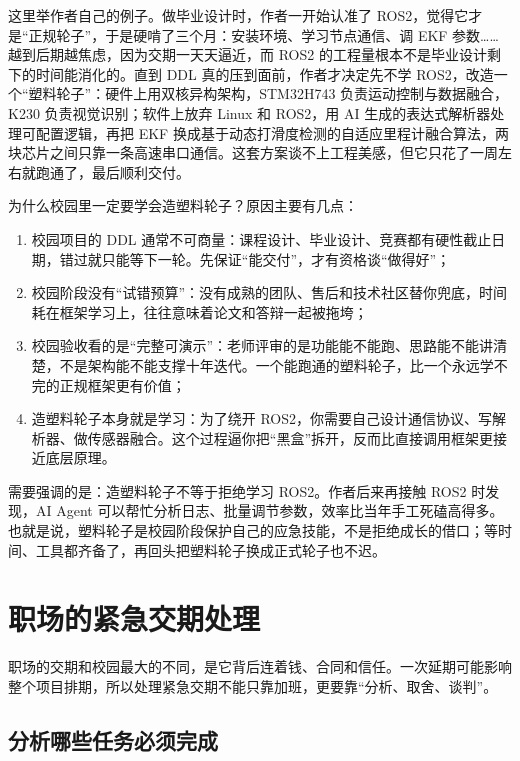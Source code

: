 这里举作者自己的例子。做毕业设计时，作者一开始认准了 ROS2，觉得它才是“正规轮子”，于是硬啃了三个月：安装环境、学习节点通信、调 EKF 参数……越到后期越焦虑，因为交期一天天逼近，而 ROS2 的工程量根本不是毕业设计剩下的时间能消化的。直到 DDL 真的压到面前，作者才决定先不学 ROS2，改造一个“塑料轮子”：硬件上用双核异构架构，STM32H743 负责运动控制与数据融合，K230 负责视觉识别；软件上放弃 Linux 和 ROS2，用 AI 生成的表达式解析器处理可配置逻辑，再把 EKF 换成基于动态打滑度检测的自适应里程计融合算法，两块芯片之间只靠一条高速串口通信。这套方案谈不上工程美感，但它只花了一周左右就跑通了，最后顺利交付。

为什么校园里一定要学会造塑料轮子？原因主要有几点：

\begin{enumerate}
\item 校园项目的 DDL 通常不可商量：课程设计、毕业设计、竞赛都有硬性截止日期，错过就只能等下一轮。先保证“能交付”，才有资格谈“做得好”；
\item 校园阶段没有“试错预算”：没有成熟的团队、售后和技术社区替你兜底，时间耗在框架学习上，往往意味着论文和答辩一起被拖垮；
\item 校园验收看的是“完整可演示”：老师评审的是功能能不能跑、思路能不能讲清楚，不是架构能不能支撑十年迭代。一个能跑通的塑料轮子，比一个永远学不完的正规框架更有价值；
\item 造塑料轮子本身就是学习：为了绕开 ROS2，你需要自己设计通信协议、写解析器、做传感器融合。这个过程逼你把“黑盒”拆开，反而比直接调用框架更接近底层原理。
\end{enumerate}

需要强调的是：造塑料轮子不等于拒绝学习 ROS2。作者后来再接触 ROS2 时发现，AI Agent 可以帮忙分析日志、批量调节参数，效率比当年手工死磕高得多。也就是说，塑料轮子是校园阶段保护自己的应急技能，不是拒绝成长的借口；等时间、工具都齐备了，再回头把塑料轮子换成正式轮子也不迟。

\section{职场的紧急交期处理}

职场的交期和校园最大的不同，是它背后连着钱、合同和信任。一次延期可能影响整个项目排期，所以处理紧急交期不能只靠加班，更要靠“分析、取舍、谈判”。

\subsection{分析哪些任务必须完成}

